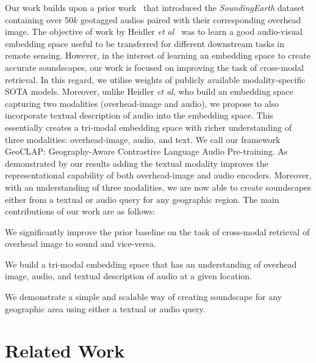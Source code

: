 \documentclass{bmvc2k}
\def\etal{\emph{et al}\bmvaOneDot}
\begin{document}
Our work builds upon a prior work~\cite{heidler2023self} that introduced the {\em SoundingEarth} dataset containing over $50k$ geotagged audios paired with their corresponding overhead image. The objective of work by Heidler \etal~\cite{heidler2023self} was to learn a good audio-visual embedding space useful to be transferred for different downstream tasks in remote sensing. However, in the interest of learning an embedding space to create accurate soundscapes, our work is focused on improving the task of cross-modal retrieval. In this regard, we utilise weights of publicly available modality-specific SOTA models. Moreover, unlike Heidler \etal, who build an embedding space capturing two modalities (overhead-image and audio), we propose to also incorporate textual description of audio into the embedding space. This essentially creates a tri-modal embedding space with richer understanding of three modalities: overhead-image, audio, and text. We call our framework GeoCLAP: Geography-Aware Contrastive Language Audio Pre-training. As demonstrated by our results adding the textual modality improves the representational capability of both overhead-image and audio encoders. Moreover, with an understanding of three modalities, we are now able to create soundscapes either from a textual or audio query for any geographic region.  The main contributions of our work are as follows:
\begin{compactitem}
 \item We significantly improve the prior baseline on the task of cross-modal retrieval of overhead image to sound and vice-versa.  
 \item We build a tri-modal embedding space that has an understanding of overhead image, audio, and textual description of audio at a given location.
 \item We demonstrate a simple and scalable way of creating soundscape for any geographic area using either a textual or audio query. 
\end{compactitem}

\section{Related Work}
\label{sec:litreview}
\end{document}

